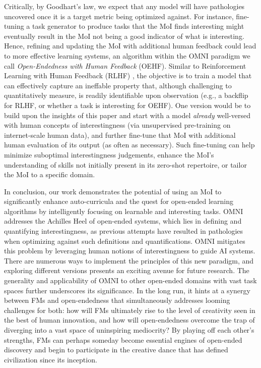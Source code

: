 \documentclass{article} %
\begin{document}
Critically, by Goodhart's law, we expect that any model will have pathologies uncovered once it is a target metric being optimized against. For instance, fine-tuning a task generator to produce tasks that the MoI finds interesting might eventually result in the MoI not being a good indicator of what is interesting. Hence, refining and updating the MoI with additional human feedback could lead to more effective learning systems, an algorithm within the OMNI paradigm we call \textit{Open-Endedness with Human Feedback} (OEHF). Similar to Reinforcement Learning with Human Feedback (RLHF) \citep{christiano2017deep}, the objective is to train a model that can effectively capture an ineffable property that, although challenging to quantitatively measure, is readily identifiable upon observation (e.g., a backflip for RLHF, or whether a task is interesting for OEHF). One version would be to build upon the insights of this paper and start with a model \emph{already} well-versed with human concepts of interestingness (via unsupervised pre-training on internet-scale human data), and further fine-tune that MoI with additional human evaluation of its output (as often as necessary). Such fine-tuning can help minimize suboptimal interestingness judgements, enhance the MoI's understanding of skills not initially present in its zero-shot repertoire, or tailor the MoI to a specific domain.

In conclusion, our work demonstrates the potential of using an MoI to significantly enhance auto-curricula and the quest for open-ended learning algorithms by intelligently focusing on learnable and interesting tasks. OMNI addresses the Achilles Heel of open-ended systems, which lies in defining and quantifying interestingness, as previous attempts have resulted in pathologies when optimizing against such definitions and quantifications. OMNI mitigates this problem by leveraging human notions of interestingness to guide AI systems. There are numerous ways to implement the principles of this new paradigm, and exploring different versions presents an exciting avenue for future research. The generality and applicability of OMNI to other open-ended domains with vast task spaces further underscores its significance. In the long run, it hints at a synergy between FMs and open-endedness that simultaneously addresses looming challenges for both: how will FMs ultimately rise to the level of creativity seen in the best of human innovation, and how will open-endedness overcome the trap of diverging into a vast space of uninspiring mediocrity?  By playing off each other's strengths, FMs can perhaps someday become essential engines of open-ended discovery and begin to participate in the creative dance that has defined civilization since its inception.
\end{document}
